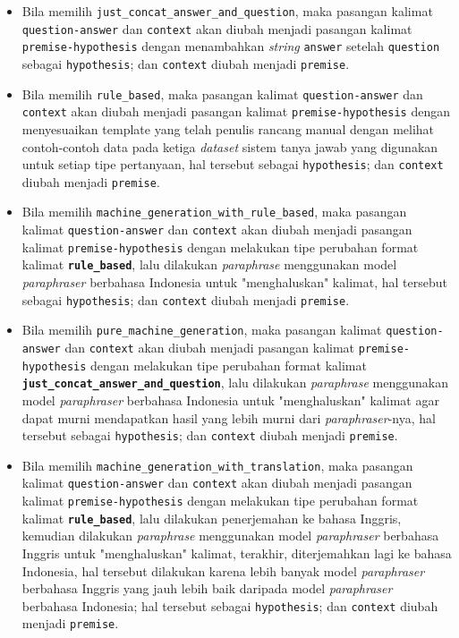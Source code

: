 \begin{itemize}
\begin{itemize}
        \item Bila memilih \texttt{just\_concat\_answer\_and\_question}, maka pasangan kalimat \texttt{question-answer} dan \texttt{context} akan diubah menjadi pasangan kalimat \texttt{premise-hypothesis} dengan menambahkan \emph{string} \texttt{answer} setelah \texttt{question} sebagai \texttt{hypothesis}; dan \texttt{context} diubah menjadi \texttt{premise}.
        
        \item  Bila memilih \texttt{rule\_based}, maka pasangan kalimat \texttt{question-answer} dan \texttt{context} akan diubah menjadi pasangan kalimat \texttt{premise-hypothesis} dengan menyesuaikan template yang telah penulis rancang manual dengan melihat contoh-contoh data pada ketiga \emph{dataset} sistem tanya jawab yang digunakan untuk setiap tipe pertanyaan, hal tersebut sebagai \texttt{hypothesis}; dan \texttt{context} diubah menjadi \texttt{premise}.
        
        \item Bila memilih \texttt{machine\_generation\_with\_rule\_based}, maka pasangan kalimat \texttt{question-answer} dan \texttt{context} akan diubah menjadi pasangan kalimat \texttt{premise-hypothesis} dengan melakukan tipe perubahan format kalimat \textbf{\texttt{rule\_based}}, lalu dilakukan \emph{paraphrase} menggunakan model \emph{paraphraser} berbahasa Indonesia untuk "menghaluskan" kalimat, hal tersebut sebagai \texttt{hypothesis}; dan \texttt{context} diubah menjadi \texttt{premise}.
        
        \item  Bila memilih \texttt{pure\_machine\_generation}, maka pasangan kalimat \texttt{question-answer} dan \texttt{context} akan diubah menjadi pasangan kalimat \texttt{premise-hypothesis} dengan melakukan tipe perubahan format kalimat \textbf{\texttt{just\_concat\_answer\_and\_question}}, lalu dilakukan \emph{paraphrase} menggunakan model \emph{paraphraser} berbahasa Indonesia untuk "menghaluskan" kalimat agar dapat murni mendapatkan hasil yang lebih murni dari \emph{paraphraser}-nya, hal tersebut sebagai \texttt{hypothesis}; dan \texttt{context} diubah menjadi \texttt{premise}.
        
        \item Bila memilih \texttt{machine\_generation\_with\_translation}, maka pasangan kalimat \texttt{question-answer} dan \texttt{context} akan diubah menjadi pasangan kalimat \texttt{premise-hypothesis} dengan melakukan tipe perubahan format kalimat \textbf{\texttt{rule\_based}}, lalu dilakukan penerjemahan ke bahasa Inggris, kemudian dilakukan \emph{paraphrase} menggunakan model \emph{paraphraser} berbahasa Inggris untuk "menghaluskan" kalimat, terakhir, diterjemahkan lagi ke bahasa Indonesia, hal tersebut dilakukan karena lebih banyak model \emph{paraphraser} berbahasa Inggris yang jauh lebih baik daripada model \emph{paraphraser} berbahasa Indonesia; hal tersebut sebagai \texttt{hypothesis}; dan \texttt{context} diubah menjadi \texttt{premise}.
    \end{itemize}
    

\end{itemize}
